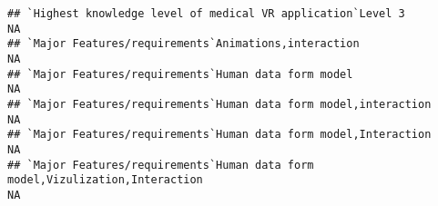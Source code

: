 \documentclass[]{article}
\begin{document}
\begin{verbatim}
## `Highest knowledge level of medical VR application`Level 3                                                                                                                                                                                                                                                                                                                                                                                                                           NA
## `Major Features/requirements`Animations,interaction                                                                                                                                                                                                                                                                                                                                                                                                                                  NA
## `Major Features/requirements`Human data form model                                                                                                                                                                                                                                                                                                                                                                                                                                   NA
## `Major Features/requirements`Human data form model,interaction                                                                                                                                                                                                                                                                                                                                                                                                                       NA
## `Major Features/requirements`Human data form model,Interaction                                                                                                                                                                                                                                                                                                                                                                                                                       NA
## `Major Features/requirements`Human data form model,Vizulization,Interaction                                                                                                                                                                                                                                                                                                                                                                                                          NA

\end{verbatim}
\end{document}
